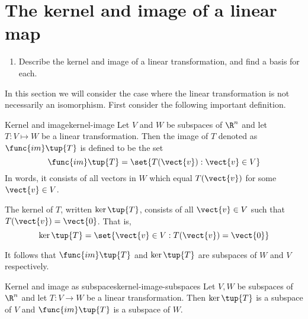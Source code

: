 \section{The kernel and image of a linear map}

\begin{outcome}
  \begin{enumerate}
  \item Describe the kernel and image of a linear transformation, and
    find a basis for each.
  \end{enumerate}
\end{outcome}

In this section we will consider the case where the linear transformation is not necessarily an
isomorphism. First consider the following important definition.

\begin{definition}{Kernel and image}{kernel-image}
Let $V$ and $W$ be subspaces of $\R^n$ and let $T:V\mapsto W$ be a linear transformation. Then the image of $T$
denoted as $\func{im}\tup{T} $ is defined to be the set 
\begin{equation*}
\func{im}\tup{T} = \set{T (\vect{v}):\vect{v}\in V}
\end{equation*}
In words, it consists of all vectors in $W$ which equal $T(\vect{v})$ for some $
\vect{v}\in V$.

The kernel of $T$, written $\ker \tup{T} $, consists of all $\vect{v}\in V$ such that $T(\vect{v})=\vect{0}$. That is, 
\begin{equation*}
\ker \tup{T} =\set{\vect{v}\in V:T(\vect{v})=\vect{0}}
\end{equation*}
\end{definition}

It follows that $\func{im}\tup{T} $ and $\ker \tup{T} $
are subspaces of $W$ and $V$ respectively.

\begin{proposition}{Kernel and image as subspaces}{kernel-image-subspaces}
Let $V, W$ be subspaces of $\R^n$ and let $T:V\rightarrow W$ be a linear transformation. Then $\ker \tup{
T} $ is a subspace of $V$ and $\func{im}\tup{T} $ is a
subspace of $W$.
\end{proposition}

